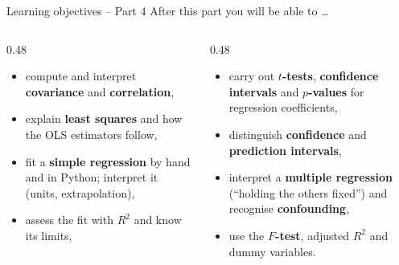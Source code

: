 \documentclass[aspectratio=169,11pt]{beamer}
\begin{document}
\begin{frame}{Learning objectives -- Part 4}
  After this part you will be able to \ldots
  \begin{columns}[T]
    \begin{column}{0.48\textwidth}
      \small\begin{itemize}\setlength{\itemsep}{0pt}
        \item compute and interpret \textbf{covariance} and
              \textbf{correlation},
        \item explain \textbf{least squares} and how the OLS estimators
              follow,
        \item fit a \textbf{simple regression} by hand and in Python;
              interpret it (units, extrapolation),
        \item assess the fit with $R^2$ and know its limits,
      \end{itemize}
    \end{column}
    \begin{column}{0.48\textwidth}
      \small\begin{itemize}\setlength{\itemsep}{0pt}
        \item carry out \textbf{$t$-tests}, \textbf{confidence intervals}
              and \textbf{$p$-values} for regression coefficients,
        \item distinguish \textbf{confidence} and \textbf{prediction
              intervals},
        \item interpret a \textbf{multiple regression} (``holding the
              others fixed'') and recognise \textbf{confounding},
        \item use the \textbf{$F$-test}, adjusted $R^2$ and dummy
              variables.
      \end{itemize}
    \end{column}
  \end{columns}
\end{frame}
\end{document}
